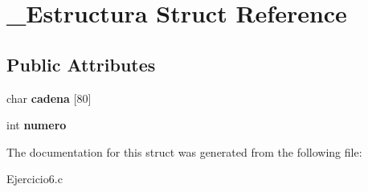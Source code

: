 \hypertarget{struct__Estructura}{}\section{\+\_\+\+Estructura Struct Reference}
\label{struct__Estructura}
\subsection*{Public Attributes}
\begin{DoxyCompactItemize}
\item 
\mbox{\label{struct__Estructura_a107a5e974e90d51e186c1a4f5360996b}} 
char {\bfseries cadena} \mbox{[}80\mbox{]}
\item 
\mbox{\label{struct__Estructura_a03532d6c329fc7ca3cad390533dd8d1b}} 
int {\bfseries numero}
\end{DoxyCompactItemize}


The documentation for this struct was generated from the following file\+:\begin{DoxyCompactItemize}
\item 
Ejercicio6.\+c\end{DoxyCompactItemize}
